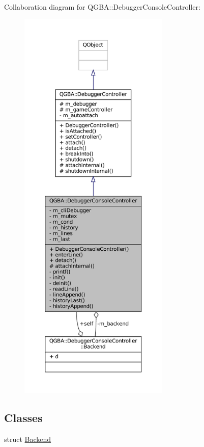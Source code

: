 Collaboration diagram for Q\+G\+BA\+:\+:Debugger\+Console\+Controller\+:
\nopagebreak
\begin{figure}[H]
\begin{center}
\leavevmode
\includegraphics[height=550pt]{class_q_g_b_a_1_1_debugger_console_controller__coll__graph}
\end{center}
\end{figure}
\subsection*{Classes}
\begin{DoxyCompactItemize}
\item 
struct \mbox{\hyperlink{class_q_g_b_a_1_1_debugger_console_controller_struct_q_g_b_a_1_1_debugger_console_controller_1_1_backend}{Backend}}
\end{DoxyCompactItemize}
